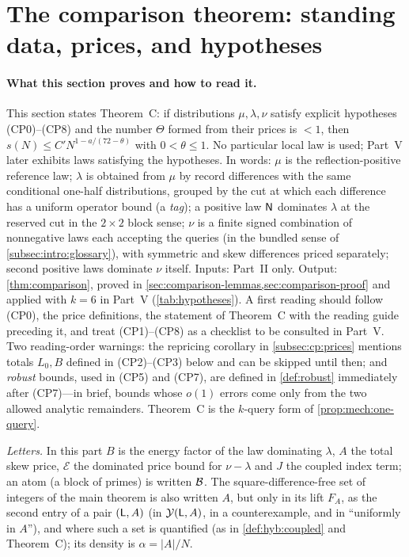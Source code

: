 \providecommand{\PushA}{\frac{5422587}{6103515625}}
\providecommand{\PushK}{890666}
\providecommand{\PushTheta}{0.99999999997327}
\section{The comparison theorem: standing data, prices, and hypotheses}
\label{sec:comparison-theorem}

\paragraph{What this section proves and how to read it.}
This section states Theorem~C: if distributions $\mu,\lambda,\nu$
satisfy explicit hypotheses (CP0)--(CP8) and the number $\Theta$
formed from their prices is $<1$, then
$s(N)\le C'N^{1-a/(72-\theta)}$ with $0<\theta\le1$. No particular
local law is used; Part~V later exhibits laws satisfying the
hypotheses. In words: $\mu$ is the reflection-positive reference
law; $\lambda$ is obtained from $\mu$ by record differences with the
same conditional one-half distributions, grouped by the cut at which
each difference has a uniform operator bound (a \emph{tag}); a
positive law $\mathsf N$ dominates $\lambda$ at the reserved cut in the
$2\times2$ block sense; $\nu$ is a finite signed combination of
nonnegative laws each accepting the queries (in the bundled sense of
\cref{subsec:intro:glossary}), with symmetric and skew differences
priced separately; second positive laws dominate $\nu$ itself.
Inputs: Part~II only. Output: \cref{thm:comparison}, proved in
\cref{sec:comparison-lemmas,sec:comparison-proof} and applied with
$k=6$ in Part~V (\cref{tab:hypotheses}). A first reading should
follow (CP0), the price definitions, the statement of Theorem~C with
the reading guide preceding it, and treat (CP1)--(CP8) as a checklist
to be consulted in Part~V. Two reading-order warnings: the
repricing corollary in \cref{subsec:cp:prices} mentions totals
$L_0,B$ defined in (CP2)--(CP3) below and can be skipped until then;
and \emph{robust} bounds, used in (CP5) and (CP7), are defined in
\cref{def:robust} immediately after (CP7)---in brief, bounds whose
$o(1)$ errors come only from the two allowed analytic remainders.
Theorem~C is the $k$-query form of \cref{prop:mech:one-query}.

\emph{Letters.} In this part $B$ is the energy factor of the law
dominating $\lambda$, $A$ the total skew price, $\mathcal E$ the
dominated price bound for $\nu-\lambda$ and $J$ the coupled index
term; an
atom (a block of primes) is written $\mathcal B$. The square-difference-free set of
integers of the main theorem is also written $A$, but only in its lift $F_A$,
as the second entry of a pair $(\mathsf L,A)$ (in $\mathcal Y(\mathsf L,A)$, in a
counterexample, and in ``uniformly in $A$''), and where such a set is
quantified (as in \cref{def:hyb:coupled} and Theorem~C); its density is
$\alpha=|A|/N$.

